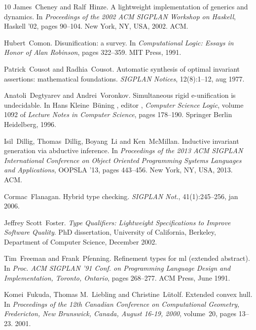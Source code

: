 \documentclass{article}
\newcommand{\tmtextit}[1]{{\itshape{#1}}}
\begin{document}
\begin{thebibliography}{10}
  James~Cheney  and 
  Ralf~Hinze.{\newblock} A lightweight implementation of generics and
  dynamics.{\newblock} In \tmtextit{Proceedings of the 2002 ACM SIGPLAN
  Workshop on Haskell}, Haskell '02,  pages  90--104. New York, NY, USA, 2002.
  ACM.{\newblock}
  
  Hubert~Comon.{\newblock} Disunification: a
  survey.{\newblock} In \tmtextit{Computational Logic: Essays in Honor of Alan
  Robinson},  pages  322--359. MIT Press, 1991.{\newblock}
  
  Patrick~Cousot  and  Radhia~Cousot.{\newblock}
  Automatic synthesis of optimal invariant assertions: mathematical
  foundations.{\newblock} \tmtextit{SIGPLAN Notices}, 12(8):1--12, aug
  1977.{\newblock}
  
  Anatoli~Degtyarev  and 
  Andrei~Voronkov.{\newblock} Simultaneous rigid e-unification is
  undecidable.{\newblock} In  Hans Kleine~B{\"u}ning , editor ,
  \tmtextit{Computer Science Logic},  volume  1092  of \tmtextit{Lecture Notes
  in Computer Science},  pages  178--190. Springer Berlin Heidelberg,
  1996.{\newblock}
  
  Isil~Dillig, Thomas~Dillig, Boyang~Li  and 
  Ken~McMillan.{\newblock} Inductive invariant generation via abductive
  inference.{\newblock} In \tmtextit{Proceedings of the 2013 ACM SIGPLAN
  International Conference on Object Oriented Programming Systems Languages
  and Applications}, OOPSLA '13,  pages  443--456. New York, NY, USA, 2013.
  ACM.{\newblock}
  
  Cormac~Flanagan.{\newblock} Hybrid type
  checking.{\newblock} \tmtextit{SIGPLAN Not.}, 41(1):245--256, jan
  2006.{\newblock}
  
  Jeffrey Scott~Foster.{\newblock} \tmtextit{Type
  Qualifiers: Lightweight Specifications to Improve Software
  Quality}.{\newblock} PhD dissertation, University of California, Berkeley,
  Department of Computer Science, December 2002.{\newblock}
  
  Tim~Freeman  and 
  Frank~Pfenning.{\newblock} Refinement types for ml (extended
  abstract).{\newblock} In \tmtextit{Proc. ACM SIGPLAN '91 Conf. on
  Programming Language Design and Implementation, Toronto, Ontario},  pages 
  268--277. ACM Press, June 1991.{\newblock}
  
  Komei~Fukuda, Thomas M.~Liebling  and 
  Christine~L{\"u}tolf.{\newblock} Extended convex hull.{\newblock} In
  \tmtextit{Proceedings of the 12th Canadian Conference on Computational
  Geometry, Fredericton, New Brunswick, Canada, August 16-19, 2000}, 
  volume~20,  pages  13--23. 2001.{\newblock}
  

\end{thebibliography}
\end{document}
